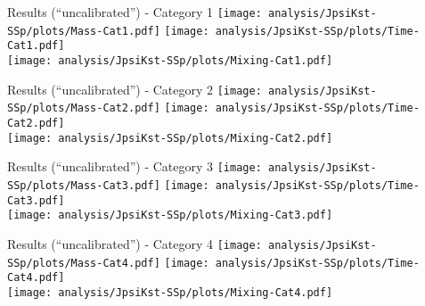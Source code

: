 \appendix
{}
\setcounter{finalframe}{\value{framenumber}}

\begin{frame}[plain]{Results (\enquote{uncalibrated}) - Category 1}
  \centering
  \texttt{[image: analysis/JpsiKst-SSp/plots/Mass-Cat1.pdf]}
  \texttt{[image: analysis/JpsiKst-SSp/plots/Time-Cat1.pdf]} \\
  \texttt{[image: analysis/JpsiKst-SSp/plots/Mixing-Cat1.pdf]}
\end{frame}

\begin{frame}[plain]{Results (\enquote{uncalibrated}) - Category 2}
  \centering
  \texttt{[image: analysis/JpsiKst-SSp/plots/Mass-Cat2.pdf]}
  \texttt{[image: analysis/JpsiKst-SSp/plots/Time-Cat2.pdf]} \\
  \texttt{[image: analysis/JpsiKst-SSp/plots/Mixing-Cat2.pdf]}
\end{frame}

\begin{frame}[plain]{Results (\enquote{uncalibrated}) - Category 3}
  \centering
  \texttt{[image: analysis/JpsiKst-SSp/plots/Mass-Cat3.pdf]}
  \texttt{[image: analysis/JpsiKst-SSp/plots/Time-Cat3.pdf]} \\
  \texttt{[image: analysis/JpsiKst-SSp/plots/Mixing-Cat3.pdf]}
\end{frame}

\begin{frame}[plain]{Results (\enquote{uncalibrated}) - Category 4}
  \centering
  \texttt{[image: analysis/JpsiKst-SSp/plots/Mass-Cat4.pdf]}
  \texttt{[image: analysis/JpsiKst-SSp/plots/Time-Cat4.pdf]} \\
  \texttt{[image: analysis/JpsiKst-SSp/plots/Mixing-Cat4.pdf]}
\end{frame}

